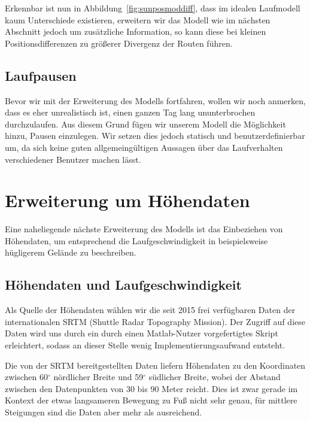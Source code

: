 \documentclass[
    paper=a4,
    DIV14,
    fontsize=12pt,
    pagesize=pdftex,
    toc=bibliographynumbered
]{scrartcl}
\numberwithin{figure}{section}
\numberwithin{equation}{section}
\numberwithin{table}{section}
\begin{document}
Erkennbar ist nun in Abbildung~\ref{fig:sunposmoddiff}, dass im idealen Laufmodell kaum
Unterschiede existieren, erweitern wir das Modell wie im nächsten Abschnitt jedoch um
zusätzliche Information, so kann diese bei kleinen Positionsdifferenzen zu größerer
Divergenz der Routen führen.

\subsection{Laufpausen}
Bevor wir mit der Erweiterung des Modells fortfahren, wollen wir noch anmerken, dass es
eher unrealistisch ist, einen ganzen Tag lang ununterbrochen durchzulaufen. Aus diesem
Grund fügen wir unserem Modell die Möglichkeit hinzu, Pausen einzulegen. Wir setzen dies
jedoch statisch und benutzerdefinierbar um, da sich keine guten allgemeingültigen Aussagen
über das Laufverhalten verschiedener Benutzer machen lässt.

\section{Erweiterung um Höhendaten}
Eine naheliegende nächste Erweiterung des Modells ist das Einbeziehen von Höhendaten, um
entsprechend die Laufgeschwindigkeit in beispielsweise hügligerem Gelände zu beschreiben.

\subsection{Höhendaten und Laufgeschwindigkeit}
Als Quelle der Höhendaten wählen wir die seit 2015 frei verfügbaren Daten der
internationalen SRTM (Shuttle Radar Topography Mission). Der Zugriff auf diese Daten wird
uns durch ein durch einen Matlab-Nutzer vorgefertigtes Skript erleichtert, sodass an
dieser Stelle wenig Implementierungsaufwand entsteht.

Die von der SRTM bereitgestellten Daten liefern Höhendaten zu den Koordinaten zwischen
60$^\circ$ nördlicher Breite und 59$^\circ$ südlicher Breite, wobei der Abstand zwischen
den Datenpunkten von 30 bis 90 Meter reicht. Dies ist zwar gerade im Kontext der etwas
langsameren Bewegung zu Fuß nicht sehr genau, für mittlere Steigungen sind die Daten aber
mehr als ausreichend.
\end{document}
